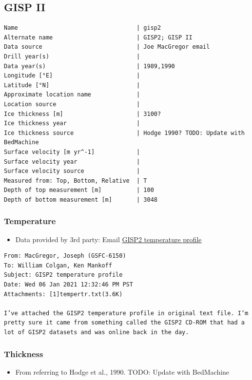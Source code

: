 \documentclass[article,a4paper,times,11pt,twoside]{article}
\begin{document}
\subsection{GISP II}
\label{sec:org1d0571e}
\begin{verbatim}
Name                                  | gisp2
Alternate name                        | GISP2; GISP II
Data source                           | Joe MacGregor email
Drill year(s)                         | 
Data year(s)                          | 1989,1990
Longitude [°E]                        | 
Latitude [°N]                         | 
Approximate location name             | 
Location source                       | 
Ice thickness [m]                     | 3100?
Ice thickness year                    | 
Ice thickness source                  | Hodge 1990? TODO: Update with BedMachine
Surface velocity [m yr^-1]            | 
Surface velocity year                 | 
Surface velocity source               | 
Measured from: Top, Bottom, Relative  | T
Depth of top measurement [m]          | 100
Depth of bottom measurement [m]       | 3048
\end{verbatim}


\subsubsection{Temperature}
\label{sec:org4febee7}

\begin{itemize}
\item Data provided by 3rd party: Email \href{msgid:8B44806A-451D-4889-9A35-D88301FA633E@nasa.gov}{GISP2 temperature profile}
\end{itemize}

\begin{verbatim}
From: MacGregor, Joseph (GSFC-6150)
To: William Colgan, Ken Mankoff
Subject: GISP2 temperature profile
Date: Wed 06 Jan 2021 12:32:46 PM PST
Attachments: [1]tempertr.txt(3.6K)

I’ve attached the GISP2 temperature profile in original text file. I’m
pretty sure it came from something called the GISP2 CD-ROM that had a
lot of GISP2 datasets and was online back in the day.
\end{verbatim}

\subsubsection{Thickness}
\label{sec:org0c72d47}

\begin{itemize}
\item From \textcite{cuffey_1992} referring to Hodge et al., 1990. TODO: Update with BedMachine
\end{itemize}
\end{document}

